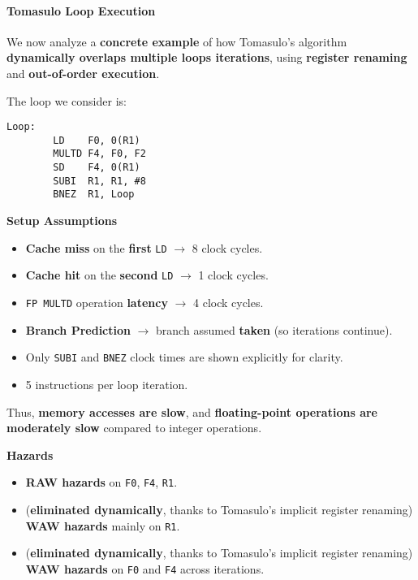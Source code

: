 \paragraph{Tomasulo Loop Execution}

We now analyze a \textbf{concrete example} of how Tomasulo's algorithm \textbf{dynamically overlaps multiple loops iterations}, using \textbf{register renaming} and \textbf{out-of-order execution}.

\highspace
The loop we consider is:
\begin{lstlisting}[language=unknown]
Loop:
        LD    F0, 0(R1)
        MULTD F4, F0, F2
        SD    F4, 0(R1)
        SUBI  R1, R1, #8
        BNEZ  R1, Loop
\end{lstlisting}

\highspace
\begin{flushleft}
    \textcolor{Green3}{ \textbf{Setup Assumptions}}
\end{flushleft}
\begin{itemize}
    \item \textbf{Cache miss} on the \textbf{first} \texttt{LD} $\rightarrow$ 8 clock cycles.
    \item \textbf{Cache hit} on the \textbf{second} \texttt{LD} $\rightarrow$ 1 clock cycles.
    \item \texttt{FP MULTD} operation \textbf{latency} $\rightarrow$ 4 clock cycles.
    \item \textbf{Branch Prediction} $\rightarrow$ branch assumed \textbf{taken} (so iterations continue).
    \item Only \texttt{SUBI} and \texttt{BNEZ} clock times are shown explicitly for clarity.
    \item 5 instructions per loop iteration.
\end{itemize}
Thus, \textbf{memory accesses are slow}, and \textbf{floating-point operations are moderately slow} compared to integer operations.

\highspace
\begin{flushleft}
    \textcolor{Red2}{ \textbf{Hazards}}
\end{flushleft}
\begin{itemize}
    \item[\textcolor{Red2}{\faIcon{times}}] \textbf{RAW hazards} on \texttt{F0}, \texttt{F4}, \texttt{R1}.
    \item[\textcolor{Green3}{\faIcon{check}}] (\textcolor{Green3}{\textbf{eliminated dynamically}}, thanks to Tomasulo's implicit register renaming) \textbf{WAW hazards} mainly on \texttt{R1}.
    \item[\textcolor{Green3}{\faIcon{check}}] (\textcolor{Green3}{\textbf{eliminated dynamically}}, thanks to Tomasulo's implicit register renaming) \textbf{WAW hazards} on \texttt{F0} and \texttt{F4} across iterations.
\end{itemize}

